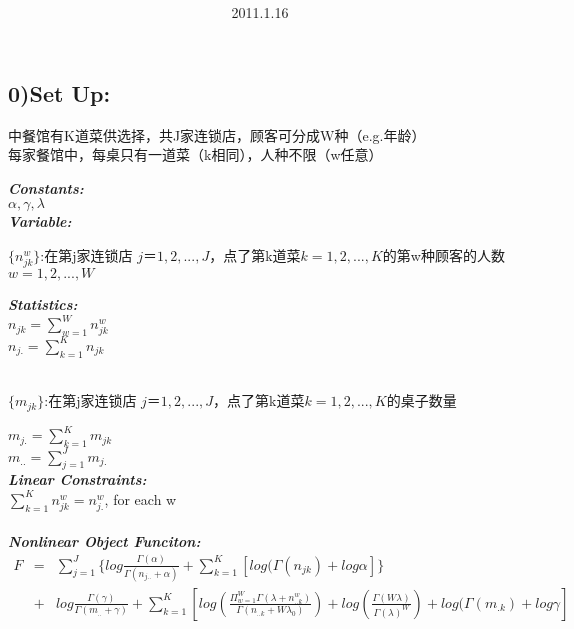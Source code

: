 \documentclass{article}
\title{\vspace{0.3in}\textmd{\textbf{\hmwkTitle}}}
\date{2011.1.16}
\author{\textbf{\hmwkAuthorName}}
\begin{document}
\begin{spacing}{1.1}
\maketitle


\section{0)Set Up:}
\begin{CJK}{UTF8}{gbsn}
中餐馆有K道菜供选择，共J家连锁店，顾客可分成W种（e.g.年龄）\\
每家餐馆中，每桌只有一道菜（k相同），人种不限（w任意）\\
\end{CJK}

{\bf \emph{Constants:}}\\
$\alpha,\gamma,\lambda$\\

{\bf \emph{Variable:}}\\
\begin{CJK}{UTF8}{gbsn}
$\{n_{jk}^{w}\}$:在第j家连锁店 $j＝1,2,...,J$，点了第k道菜$k=1,2,...,K$的第w种顾客的人数$w=1,2,...,W$
\end{CJK}
{\bf \emph{Statistics:}}\\
$n_{jk}=\sum_{w=1}^{W} n_{jk}^{w}$\\ 
$n_{j.}=\sum_{k=1}^{K} n_{jk}$ \\ \\
\begin{CJK}{UTF8}{gbsn}
$\{m_{jk}\}$:在第j家连锁店 $j＝1,2,...,J$，点了第k道菜$k=1,2,...,K$的桌子数量 \\
\end{CJK}
$m_{j.}=\sum_{k=1}^{K} m_{jk}$\\
$m_{..}=\sum_{j=1}^{J} m_{j.}$\\

{\bf \emph{Linear Constraints:}}\\
$\sum_{k=1}^{K} n_{jk}^{w}=n_{j.}^{w}$, for each w\\ \\

{\bf \emph{Nonlinear Object Funciton:}}
\begin{eqnarray*}
F
&=&\sum_{j=1}^{J} \{log \frac{\Gamma(\alpha)}{\Gamma(n_{j..}+\alpha)}+\sum_{k=1}^{K}[log(\Gamma(n_{jk})+log \alpha
]\} \\
&+&log \frac{\Gamma(\gamma)}{\Gamma(m_{..}+\gamma)}+\sum_{k=1}^{K} [log(\frac{\Pi_{w=1}^{W}\Gamma(\lambda+n_{..k}^{w})}{\Gamma(n_{..k}+W\lambda_{0})})+log(\frac{\Gamma(W\lambda)}{\Gamma(\lambda)^{W}})
+log(\Gamma(m_{.k})+log \gamma]\\ 
\end{eqnarray*}


\end{spacing}
\end{document}
